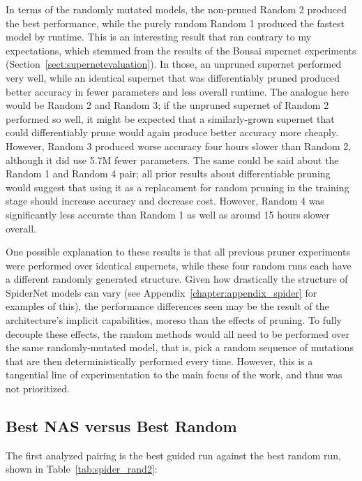 In terms of the randomly mutated models, the non-pruned Random 2 produced the best performance,
while the purely random Random 1 produced the fastest model by runtime. This is an interesting result that ran
contrary to my expectations, which stemmed from the results of the Bonsai supernet experiments (Section~\ref{sect:supernetevaluation}).
In those, an unpruned supernet performed very well, while an identical supernet that was differentiably pruned produced
better accuracy in fewer parameters and less overall runtime. The analogue here would be Random 2 and Random 3; if the unpruned
supernet of Random 2 performed so well, it might be expected that a similarly-grown supernet that could differentiably prune would again
produce better accuracy more cheaply. However, Random 3 produced worse accuracy four hours slower than Random 2, although it
did use 5.7M fewer parameters. The same could be said about the Random 1 and Random 4 pair; all prior results about
differentiable pruning would suggest that using it as a replacament for random pruning in the training stage should increase
accuracy and decrease cost. However, Random 4 was significantly less accurate than Random 1 as well as around 15
hours slower overall.

One possible explanation to these results is that all previous pruner experiments were performed over identical
supernets, while these four random runs each have a different randomly generated structure. Given how drastically
the structure of SpiderNet models can vary (see Appendix~\ref{chapter:appendix_spider} for examples of this), the
performance differences seen may be the result of the architecture's implicit capabilities, moreso than the effects
of pruning. To fully decouple these effects, the random methods would all need to be performed over the same
randomly-mutated model, that is, pick a random sequence of mutations that are then deterministically performed
every time. However, this is a tangential line of experimentation to the main focus of the work, and thus was not
prioritized.

\subsection{Best NAS versus Best Random}\label{sect:spider_bestvbest}
The first analyzed pairing is the best guided run against the best random run, shown in Table~\ref{tab:spider_rand2}:

